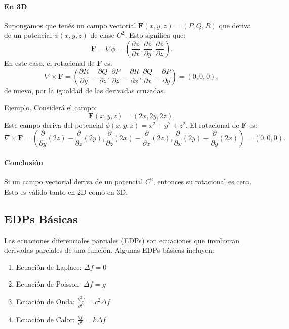 \documentclass[11pt]{book}
\theoremstyle{definicion}
\theoremstyle{teorema}
\theoremstyle{ejemplo}
\begin{document}
\paragraph{En 3D}
Supongamos que tenés un campo vectorial \(\mathbf{F}(x, y, z) = (P, Q, R)\) que deriva de un potencial \(\phi(x, y, z)\) de clase \(C^2\). Esto significa que:
\[
\mathbf{F} = \nabla \phi = \left( \frac{\partial \phi}{\partial x}, \frac{\partial \phi}{\partial y}, \frac{\partial \phi}{\partial z} \right).
\]
En este caso, el rotacional de \(\mathbf{F}\) es:
\[
\nabla \times \mathbf{F} = \left( \frac{\partial R}{\partial y} - \frac{\partial Q}{\partial z}, \frac{\partial P}{\partial z} - \frac{\partial R}{\partial x}, \frac{\partial Q}{\partial x} - \frac{\partial P}{\partial y} \right) = (0, 0, 0),
\]
de nuevo, por la igualdad de las derivadas cruzadas.

\noindent Ejemplo.
Considerá el campo:
\[
\mathbf{F}(x, y, z) = (2x, 2y, 2z).
\]
Este campo deriva del potencial \(\phi(x, y, z) = x^2 + y^2 + z^2\). El rotacional de \(\mathbf{F}\) es:
\[
\nabla \times \mathbf{F} = \left( \frac{\partial}{\partial y}(2z) - \frac{\partial}{\partial z}(2y), \frac{\partial}{\partial z}(2x) - \frac{\partial}{\partial x}(2z), \frac{\partial}{\partial x}(2y) - \frac{\partial}{\partial y}(2x) \right) = (0, 0, 0).
\]

\paragraph{Conclusión}
Si un campo vectorial deriva de un potencial \(C^2\), entonces su rotacional es cero. Esto es válido tanto en 2D como en 3D.


\subsection{EDPs Básicas}

\noindent
Las ecuaciones diferenciales parciales (EDPs) son ecuaciones que involucran derivadas parciales de una función. Algunas EDPs básicas incluyen:
\begin{enumerate}
    \item Ecuación de Laplace: \( \Delta f = 0 \)
    \item Ecuación de Poisson: \( \Delta f = g \)
    \item Ecuación de Onda: \( \frac{\partial^2 f}{\partial t^2} = c^2 \Delta f \)
    \item Ecuación de Calor: \( \frac{\partial f}{\partial t} = k \Delta f \)
\end{enumerate}
\end{document}
